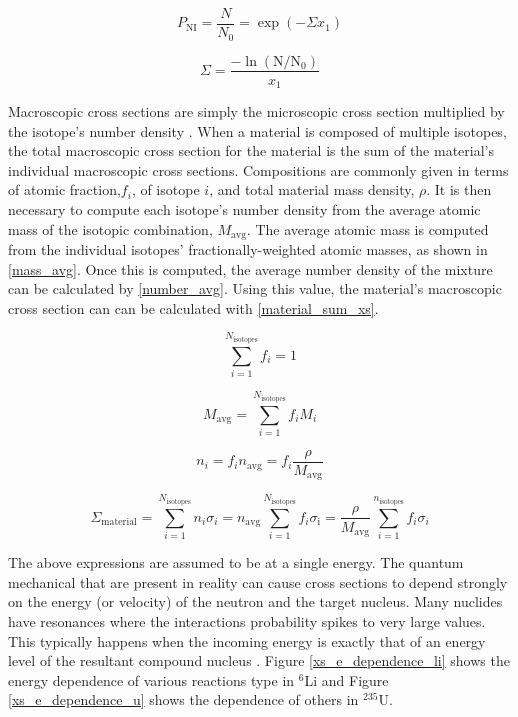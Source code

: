 \begin{equation}
P_\mathrm{NI} = \frac{N}{N_0} = \exp \left(- \Sigma x_1 \right)
\label{pop_NI}
\end{equation}

\begin{equation}
\Sigma = \frac{ - \ln \left(    \mathrm{N} / \mathrm{N}_0  \right )  }  {x_1}
\label{pop_beam}
\end{equation}

Macroscopic cross sections are simply the microscopic cross section multiplied by the isotope's number density \cite{duderstadt}.  When a material is composed of multiple isotopes, the total macroscopic cross section for the material is the sum of the material's individual macroscopic cross sections.  Compositions are commonly given in terms of atomic fraction,$f_i$, of isotope $i$, and total material mass density, $\rho$.  It is then necessary to compute each isotope's number density from the average atomic mass of the isotopic combination, $M_\mathrm{avg}$.  The average atomic mass is computed from the individual isotopes' fractionally-weighted atomic masses, as shown in \eqref{mass_avg}.  Once this is computed, the average number density of the mixture can be calculated by \eqref{number_avg}.  Using this value, the material's macroscopic cross section can can be calculated with \eqref{material_sum_xs}.

\begin{equation}
\sum_{i=1}^{N_\mathrm{isotopes}} f_i =1
\label{fraction_norm}
\end{equation}

\begin{equation}
M_\mathrm{avg} = \sum_{i=1}^{N_\mathrm{isotopes}} f_i M_i
\label{mass_avg}
\end{equation}

\begin{equation}
n_i = f_i n_\mathrm{avg} = f_i \frac{\rho}{M_\mathrm{avg}}
\label{number_avg}
\end{equation}

\begin{equation}
\Sigma_{\mathrm{material}} = \sum_{i=1}^{N_\mathrm{isotopes}} n_i \sigma_i = n_\mathrm{avg} \sum_{i=1}^{N_\mathrm{isotopes}} f_i \sigma_\mathrm{i} = \frac{\rho}{M_\mathrm{avg}} \sum_{i=1}^{n_\mathrm{isotopes}} f_i \sigma_i 
\label{material_sum_xs}
\end{equation}

The above expressions are assumed to be at a single energy. The quantum mechanical that are present in reality can cause cross sections to depend strongly on the energy (or velocity) of the neutron and the target nucleus.  Many nuclides have resonances where the interactions probability spikes to very large values.  This typically happens when the incoming energy is exactly that of an energy level of the resultant compound nucleus \cite{duderstadt}.   Figure \ref{xs_e_dependence_li} shows the energy dependence of various reactions type in $^6$Li and Figure \ref{xs_e_dependence_u} shows the dependence of others in $^{235}$U.  

